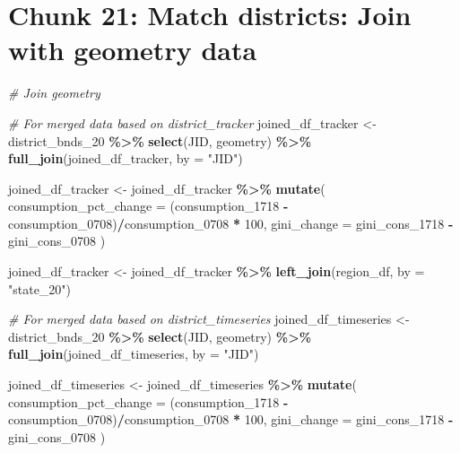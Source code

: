 \documentclass[
]{article}
\newenvironment{Shaded}{\begin{snugshade}}{\end{snugshade}}
\newcommand{\AttributeTok}[1]{\textcolor[rgb]{0.13,0.29,0.53}{#1}}
\newcommand{\CommentTok}[1]{\textcolor[rgb]{0.56,0.35,0.01}{\textit{#1}}}
\newcommand{\DecValTok}[1]{\textcolor[rgb]{0.00,0.00,0.81}{#1}}
\newcommand{\FunctionTok}[1]{\textcolor[rgb]{0.13,0.29,0.53}{\textbf{#1}}}
\newcommand{\NormalTok}[1]{#1}
\newcommand{\OtherTok}[1]{\textcolor[rgb]{0.56,0.35,0.01}{#1}}
\newcommand{\SpecialCharTok}[1]{\textcolor[rgb]{0.81,0.36,0.00}{\textbf{#1}}}
\newcommand{\StringTok}[1]{\textcolor[rgb]{0.31,0.60,0.02}{#1}}
\begin{document}
\section*{Chunk 21: Match districts: Join with geometry data}\label{chunk-21-match-districts-join-with-geometry-data}

\begin{Shaded}
\begin{Highlighting}[]
\CommentTok{\# Join geometry}

\CommentTok{\# For merged data based on district\_tracker}
\NormalTok{joined\_df\_tracker }\OtherTok{\textless{}{-}}\NormalTok{ district\_bnds\_20 }\SpecialCharTok{\%\textgreater{}\%}
    \FunctionTok{select}\NormalTok{(JID, geometry) }\SpecialCharTok{\%\textgreater{}\%}
    \FunctionTok{full\_join}\NormalTok{(joined\_df\_tracker, }\AttributeTok{by =} \StringTok{"JID"}\NormalTok{)}

\NormalTok{joined\_df\_tracker }\OtherTok{\textless{}{-}}\NormalTok{ joined\_df\_tracker }\SpecialCharTok{\%\textgreater{}\%}
    \FunctionTok{mutate}\NormalTok{(}
        \AttributeTok{consumption\_pct\_change =}\NormalTok{ (consumption\_1718 }\SpecialCharTok{{-}}
\NormalTok{            consumption\_0708)}\SpecialCharTok{/}\NormalTok{consumption\_0708 }\SpecialCharTok{*} \DecValTok{100}\NormalTok{,}
        \AttributeTok{gini\_change =}\NormalTok{ gini\_cons\_1718 }\SpecialCharTok{{-}}\NormalTok{ gini\_cons\_0708}
\NormalTok{    )}

\NormalTok{joined\_df\_tracker }\OtherTok{\textless{}{-}}\NormalTok{ joined\_df\_tracker }\SpecialCharTok{\%\textgreater{}\%}
    \FunctionTok{left\_join}\NormalTok{(region\_df, }\AttributeTok{by =} \StringTok{"state\_20"}\NormalTok{)}


\CommentTok{\# For merged data based on district\_timeseries}
\NormalTok{joined\_df\_timeseries }\OtherTok{\textless{}{-}}\NormalTok{ district\_bnds\_20 }\SpecialCharTok{\%\textgreater{}\%}
    \FunctionTok{select}\NormalTok{(JID, geometry) }\SpecialCharTok{\%\textgreater{}\%}
    \FunctionTok{full\_join}\NormalTok{(joined\_df\_timeseries, }\AttributeTok{by =} \StringTok{"JID"}\NormalTok{)}

\NormalTok{joined\_df\_timeseries }\OtherTok{\textless{}{-}}\NormalTok{ joined\_df\_timeseries }\SpecialCharTok{\%\textgreater{}\%}
    \FunctionTok{mutate}\NormalTok{(}
        \AttributeTok{consumption\_pct\_change =}\NormalTok{ (consumption\_1718 }\SpecialCharTok{{-}}
\NormalTok{            consumption\_0708)}\SpecialCharTok{/}\NormalTok{consumption\_0708 }\SpecialCharTok{*} \DecValTok{100}\NormalTok{,}
        \AttributeTok{gini\_change =}\NormalTok{ gini\_cons\_1718 }\SpecialCharTok{{-}}\NormalTok{ gini\_cons\_0708}
\NormalTok{    )}


\end{Highlighting}
\end{Shaded}
\end{document}
